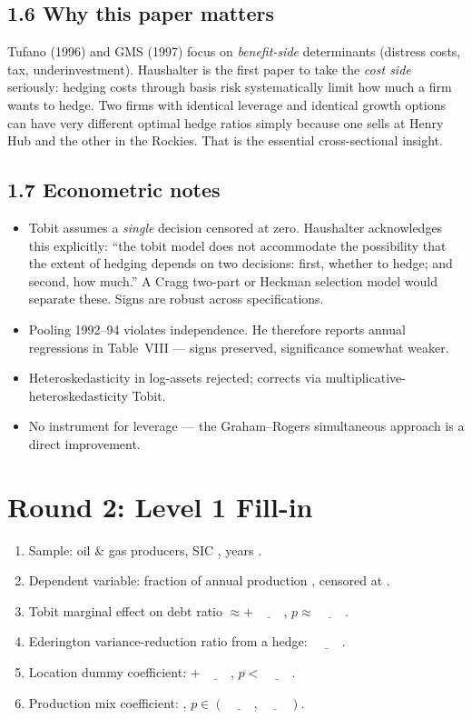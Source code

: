 \documentclass[11pt]{article}
\newcommand{\blank}[1]{\underline{\hspace{#1}}}
\begin{document}
\subsection*{1.6 Why this paper matters}
\begin{keybox}
Tufano (1996) and GMS (1997) focus on \emph{benefit-side} determinants (distress costs, tax, underinvestment). Haushalter is the first paper to take the \emph{cost side} seriously: hedging costs through basis risk systematically limit how much a firm wants to hedge. Two firms with identical leverage and identical growth options can have very different optimal hedge ratios simply because one sells at Henry Hub and the other in the Rockies. That is the essential cross-sectional insight.
\end{keybox}

\subsection*{1.7 Econometric notes}
\begin{alertbox}
\begin{itemize}
\item Tobit assumes a \emph{single} decision censored at zero. Haushalter acknowledges this explicitly: ``the tobit model does not accommodate the possibility that the extent of hedging depends on two decisions: first, whether to hedge; and second, how much.'' A Cragg two-part or Heckman selection model would separate these. Signs are robust across specifications.
\item Pooling 1992--94 violates independence. He therefore reports annual regressions in Table~VIII --- signs preserved, significance somewhat weaker.
\item Heteroskedasticity in log-assets rejected; corrects via multiplicative-heteroskedasticity Tobit.
\item No instrument for leverage --- the Graham--Rogers simultaneous approach is a direct improvement.
\end{itemize}
\end{alertbox}

\section*{Round 2: Level 1 Fill-in}
\begin{enumerate}
\item Sample: \blank{1cm} oil \& gas producers, SIC \blank{1cm}, years \blank{2cm}.
\item Dependent variable: fraction of annual production \blank{1.5cm}, censored at \blank{0.7cm}.
\item Tobit marginal effect on debt ratio $\approx +\blank{1cm}$, $p\approx\blank{1cm}$.
\item Ederington variance-reduction ratio from a hedge: $\blank{1cm}$.
\item Location dummy coefficient: $+\blank{1cm}$, $p<\blank{1cm}$.
\item Production mix coefficient: \blank{1cm}, $p\in(\blank{1cm},\blank{1cm})$.
\end{enumerate}
\end{document}
